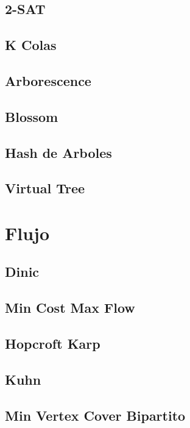 \documentclass[a4paper,10pt,twocolumn]{article}
\begin{document}
\subsection{2-SAT}

\subsection{K Colas}

\subsection{Arborescence}

\subsection{Blossom}

\subsection{Hash de Arboles}

\subsection{Virtual Tree}


\section{Flujo} %
\subsection{Dinic}

\subsection{Min Cost Max Flow}

\subsection{Hopcroft Karp}

\subsection{Kuhn}

\subsection{Min Vertex Cover Bipartito}

\end{document}

